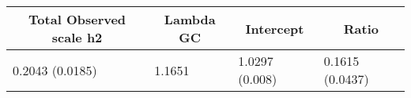 \begin{center}
\begin{tabular}{llll}
\hline\hline
\multicolumn{1}{c}{Total Observed scale h2}&\multicolumn{1}{c}{Lambda GC}&\multicolumn{1}{c}{Intercept}&\multicolumn{1}{c}{Ratio}\tabularnewline
\hline
0.2043 (0.0185)&1.1651&1.0297 (0.008)&0.1615 (0.0437)\tabularnewline
\hline
\end{tabular}\end{center}

